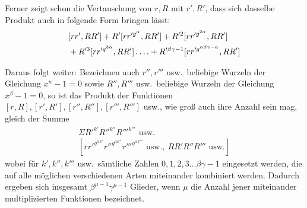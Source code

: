 Ferner zeigt schon die Vertauschung von $r,R$ mit $r',R'$, dass sich dasselbe Produkt auch in folgende Form bringen lässt:
\[
\begin{aligned}
&[rr',RR']+R'[rr'^{g^\alpha},RR']+R'^2[rr'^{g^{2\alpha}},RR']\\
&{}+R'^3[rr'^{g^{3\alpha}},RR']\mathinner{.\,.\,.\,.}+R'^{\beta\gamma-1}[rr'^{g^{\alpha\beta\gamma-\alpha}},RR']
\end{aligned}
\]

Daraus folgt weiter: Bezeichnen auch $r'',r'''$ usw.\ beliebige Wurzeln der Gleichung \mbox{$x^n-1=0$} sowie $R'',R'''$ usw.\ beliebige Wurzeln der Gleichung \mbox{$x^\beta-1=0$}, so ist das Produkt der Funktionen $[r,R],[r',R'],[r'',R''],[r''',R''']$ usw., wie groß auch ihre Anzahl sein mag, gleich der Summe
\[
\begin{gathered}
\Sigma R'^{k'}R''^{k''}R'''^{k'''}\text{ usw.}\\
{}[rr'^{g^{\alpha k'}}r''^{g^{\alpha k''}}r'''^{g^{\alpha k'''}}\text{ usw.},\ RR'R''R'''\text{ usw.}]
\end{gathered}
\]
wobei für $k',k'',k'''$ usw.\ sämtliche Zahlen $0,1,2,3\ldots\beta\gamma-1$ eingesetzt werden, die auf alle möglichen verschiedenen Arten miteinander kombiniert werden. Dadurch ergeben sich insgesamt $\beta^{\mu-1}\gamma^{\mu-1}$ Glieder, wenn $\mu$ die Anzahl jener miteinander multiplizierten Funktionen bezeichnet.
